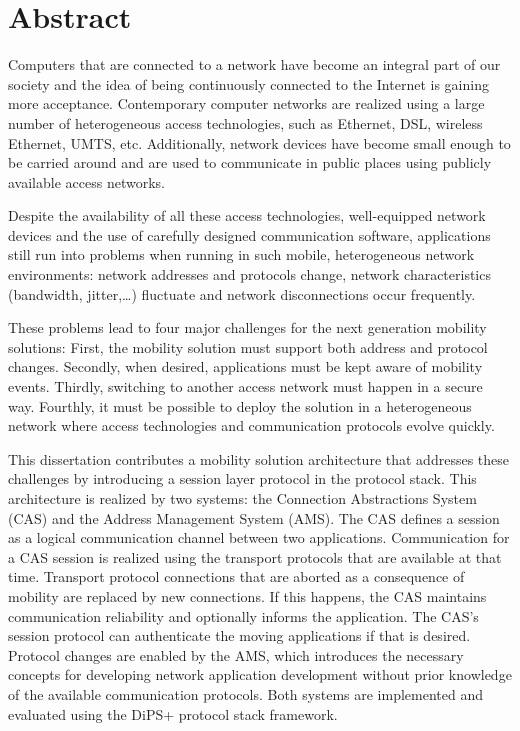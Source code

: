 \section*{Abstract}

Computers that are connected to a network have become an integral part of our society and the idea of being continuously connected to the Internet is gaining more acceptance.  Contemporary computer networks are realized using a large number of heterogeneous access technologies, such as Ethernet, DSL, wireless Ethernet, UMTS, etc.   Additionally, network devices have become small enough to be carried around and are used to communicate in public places using publicly available access networks.

Despite the availability of all these access technologies, well-equipped network devices and the use of carefully designed communication software, applications still run into problems when running in such mobile, heterogeneous network environments: network addresses and protocols change, network characteristics (bandwidth, jitter,\dots) fluctuate and network disconnections occur frequently.

These problems lead to four major challenges for the next generation mobility solutions:  First, the mobility solution must support both address and protocol changes. Secondly, when desired, applications must be kept aware of mobility events. Thirdly, switching to another access network must happen in a secure way. Fourthly, it must be possible to deploy the solution in a heterogeneous network where access technologies and communication protocols evolve quickly.

This dissertation contributes a mobility solution architecture that addresses these challenges by introducing a session layer protocol in the protocol stack.  This architecture is realized by two systems:  the Connection Abstractions System (CAS) and the Address Management System (AMS).  The CAS defines a session as a logical communication channel between two applications.  Communication for a CAS session is realized using the transport protocols that are available at that time.  Transport protocol connections that are aborted as a consequence of mobility are replaced by new connections.  If this happens, the CAS maintains communication reliability and optionally informs the application.  The CAS's session protocol can authenticate the moving applications if that is desired.  Protocol changes are enabled by the AMS, which introduces the necessary concepts for developing network application development without prior knowledge of the available communication protocols.  Both systems are implemented and evaluated using the DiPS+ protocol stack framework.%

